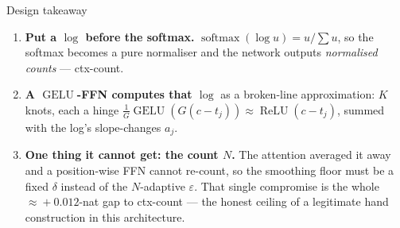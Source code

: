 \documentclass[11pt]{article}
\newcommand{\relu}{\operatorname{ReLU}}
\newcommand{\gelu}{\operatorname{GELU}}
\newcommand{\sm}{\operatorname{softmax}}
\begin{document}
\begin{takebox}{Design takeaway}
\begin{enumerate}[nosep,leftmargin=1.4em]
\item \textbf{Put a $\log$ before the softmax.} $\sm(\log u)=u/\sum u$, so the softmax becomes a pure
normaliser and the network outputs \emph{normalised counts} --- ctx-count.
\item \textbf{A $\gelu$-FFN computes that $\log$} as a broken-line approximation: $K$ knots, each a hinge
$\tfrac1G\gelu(G(c-t_j))\approx\relu(c-t_j)$, summed with the log's slope-changes $a_j$.
\item \textbf{One thing it cannot get: the count $N$.} The attention averaged it away and a position-wise
FFN cannot re-count, so the smoothing floor must be a fixed $\delta$ instead of the $N$-adaptive
$\varepsilon$. That single compromise is the whole $\approx\!+0.012$-nat gap to ctx-count --- the honest
ceiling of a legitimate hand construction in this architecture.
\end{enumerate}
\end{takebox}
\end{document}
